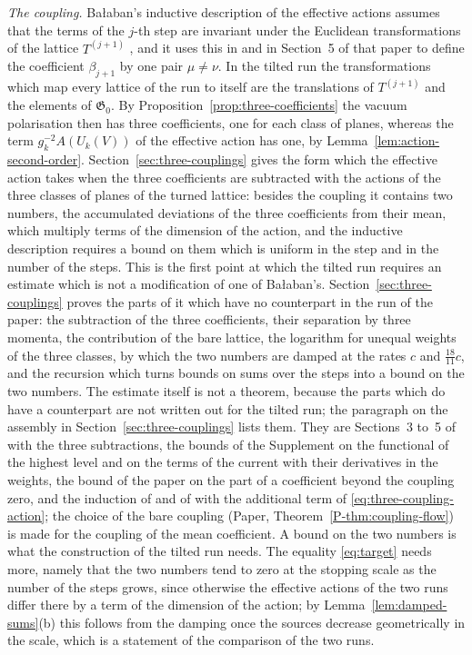 \documentclass[11pt]{preprint}
\numberwithin{equation}{section}
\theoremstyle{definition}
\theoremstyle{remark}
\theoremstyle{plain}
\begin{document}
\emph{The coupling.} Ba{\l}aban's inductive description of the effective actions assumes that the terms of the $j$-th step are invariant under the Euclidean transformations of the lattice $T^{(j+1)}$ \cite[p.~263]{BalabanRG1}, and it uses this in \cite[(1.21), (1.22)]{BalabanRG1} and in Section~5 of that paper to define the coefficient $\beta_{j+1}$ by one pair $\mu \neq \nu$. In the tilted run the transformations which map every lattice of the run to itself are the translations of $T^{(j+1)}$ and the elements of $\mathfrak G_0$. By Proposition~\ref{prop:three-coefficients} the vacuum polarisation then has three coefficients, one for each class of planes, whereas the term $g_k^{-2}A(U_k(V))$ of the effective action has one, by Lemma~\ref{lem:action-second-order}. Section~\ref{sec:three-couplings} gives the form which the effective action takes when the three coefficients are subtracted with the actions of the three classes of planes of the turned lattice: besides the coupling it contains two numbers, the accumulated deviations of the three coefficients from their mean, which multiply terms of the dimension of the action, and the inductive description requires a bound on them which is uniform in the step and in the number of the steps. This is the first point at which the tilted run requires an estimate which is not a modification of one of Ba{\l}aban's. Section~\ref{sec:three-couplings} proves the parts of it which have no counterpart in the run of the paper: the subtraction of the three coefficients, their separation by three momenta, the contribution of the bare lattice, the logarithm for unequal weights of the three classes, by which the two numbers are damped at the rates $c$ and $\frac{18}{11}c$, and the recursion which turns bounds on sums over the steps into a bound on the two numbers. The estimate itself is not a theorem, because the parts which do have a counterpart are not written out for the tilted run; the paragraph on the assembly in Section~\ref{sec:three-couplings} lists them. They are Sections~3 to~5 of \cite{BalabanRG1} with the three subtractions, the bounds of the Supplement on the functional of the highest level and on the terms of the current with their derivatives in the weights, the bound of the paper on the part of a coefficient beyond the coupling zero, and the induction of \cite{BalabanRG1} and of \cite[Theorem~1, p.~262]{BalabanCRE} with the additional term of \eqref{eq:three-coupling-action}; the choice of the bare coupling (Paper, Theorem~\ref{P-thm:coupling-flow}) is made for the coupling of the mean coefficient. A bound on the two numbers is what the construction of the tilted run needs. The equality \eqref{eq:target} needs more, namely that the two numbers tend to zero at the stopping scale as the number of the steps grows, since otherwise the effective actions of the two runs differ there by a term of the dimension of the action; by Lemma~\ref{lem:damped-sums}(b) this follows from the damping once the sources decrease geometrically in the scale, which is a statement of the comparison of the two runs.
\end{document}
